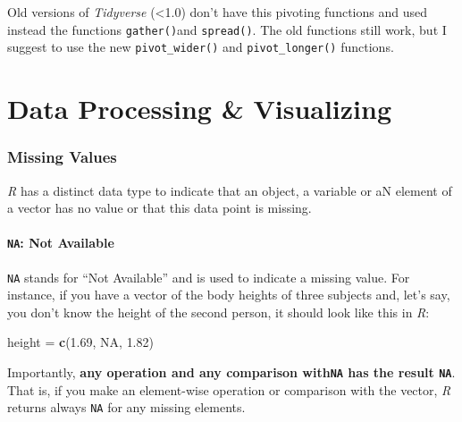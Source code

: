 \documentclass[
]{scrartcl}
\makeatletter
\newenvironment{Shaded}{\begin{snugshade}}{\end{snugshade}}
\newcommand{\ConstantTok}[1]{\textcolor[rgb]{0.56,0.35,0.01}{#1}}
\newcommand{\FloatTok}[1]{\textcolor[rgb]{0.00,0.00,0.81}{#1}}
\newcommand{\FunctionTok}[1]{\textcolor[rgb]{0.13,0.29,0.53}{\textbf{#1}}}
\newcommand{\NormalTok}[1]{#1}
\newcommand{\OtherTok}[1]{\textcolor[rgb]{0.56,0.35,0.01}{#1}}
\newenvironment{kframe}{%
\medskip{}
\setlength{\fboxsep}{.8em}
 \def\at@end@of@kframe{}%
 \ifinner\ifhmode%
  \def\at@end@of@kframe{\end{minipage}}%
  \begin{minipage}{\columnwidth}%
 \fi\fi%
 \def\FrameCommand##1{\hskip\@totalleftmargin \hskip-\fboxsep
 \colorbox{shadecolor}{##1}\hskip-\fboxsep
     \hskip-\linewidth \hskip-\@totalleftmargin \hskip\columnwidth}%
 \MakeFramed {\advance\hsize-\width
   \@totalleftmargin\z@ \linewidth\hsize
   \@setminipage}}%
 {\par\unskip\endMakeFramed%
 \at@end@of@kframe}
\newenvironment{rmdblock}[1]
  {
  \begin{itemize}
  \renewcommand{\labelitemi}{
    \raisebox{-.7\height}[0pt][0pt]{
      {\setkeys{Gin}{width=3em,keepaspectratio}\texttt{[image: images/\#1]}}
    }
  }
  \setlength{\fboxsep}{1em}
  \begin{kframe}
  \item
  }
  {
  \end{kframe}
  \end{itemize}
  }
\newenvironment{geek}
    {\begin{rmdblock}{geek}}
    {\end{rmdblock}}
\makeatother
\begin{document}
\begin{geek}
Old versions of \emph{Tidyverse} (\textless1.0) don't have this pivoting
functions and used instead the functions \texttt{gather()}and
\texttt{spread()}. The old functions still work, but I suggest to use
the new \texttt{pivot\_wider()} and \texttt{pivot\_longer()} functions.
\end{geek}

\newpage

\hypertarget{part-data-processing-visualizing}{%
\part{Data Processing \& Visualizing}\label{part-data-processing-visualizing}}

\hypertarget{missing-values}{%
\section{Missing Values}\label{missing-values}}

\emph{R} has a distinct data type to indicate that an object, a variable or aN element of a vector has no value or that this data point is missing.

\hypertarget{na-not-available}{%
\subsection{\texorpdfstring{\texttt{NA}: Not Available}{NA: Not Available}}\label{na-not-available}}

\texttt{NA} stands for ``Not Available'' and is used to indicate a missing value. For instance, if you have a vector of the body heights of three subjects and, let's say, you don't know the height of the second person, it should look like this in \emph{R}:

\begin{Shaded}
\begin{Highlighting}[]
\NormalTok{height }\OtherTok{=} \FunctionTok{c}\NormalTok{(}\FloatTok{1.69}\NormalTok{, }\ConstantTok{NA}\NormalTok{, }\FloatTok{1.82}\NormalTok{)}
\end{Highlighting}
\end{Shaded}

Importantly, \textbf{any operation and any comparison with\texttt{NA} has the result \texttt{NA}}. That is, if you make an element-wise operation or comparison with the vector, \emph{R} returns always \texttt{NA} for any missing elements.
\end{document}
